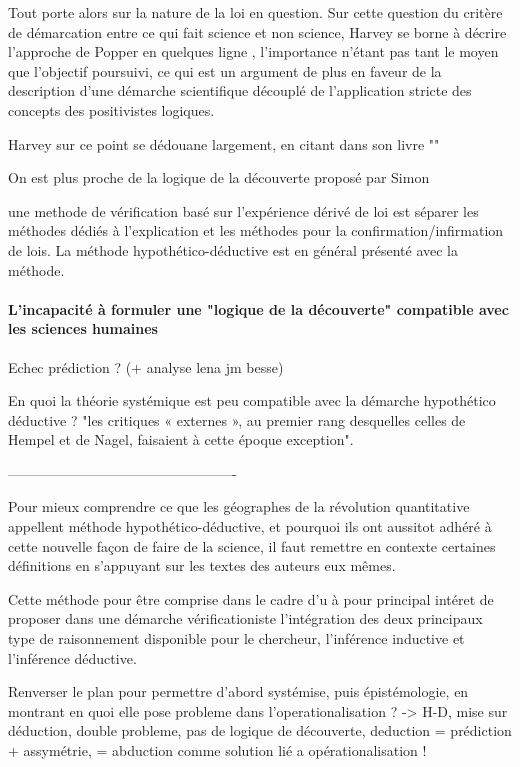 {Tout porte alors sur la nature de la loi en question. Sur cette question du critère de démarcation entre ce qui fait science et non science, Harvey se borne à décrire l'approche de Popper en quelques ligne \autocite{Johnston2002}, l'importance n'étant pas tant le moyen que l'objectif poursuivi, ce qui est un argument de plus en faveur de la description d'une démarche scientifique découplé de l'application stricte des concepts des positivistes logiques.

Harvey sur ce point se dédouane largement, en citant dans son livre ""


On est plus proche de la logique de la découverte proposé par Simon

une methode de vérification basé sur l'expérience dérivé de loi  est séparer les méthodes dédiés à l'explication et les méthodes pour la confirmation/infirmation de lois. La méthode hypothético-déductive est en général présenté avec la méthode.


\paragraph{L'incapacité à formuler une "logique de la découverte" compatible avec les sciences humaines}

Echec prédiction ?
(+ analyse lena jm besse)

En quoi la théorie systémique est peu compatible avec la démarche hypothético déductive ? 
"les critiques « externes », au premier rang desquelles celles de Hempel et de Nagel, faisaient à cette époque exception". \autocite[963]{Pouvreau2013}


-------------------------------------------------


Pour mieux comprendre ce que les géographes de la révolution quantitative appellent méthode hypothético-déductive, et pourquoi ils ont aussitot adhéré à cette nouvelle façon de faire de la science, il faut remettre en contexte certaines définitions en s'appuyant sur les textes des auteurs eux mêmes.

Cette méthode pour être comprise dans le cadre d'u à pour principal intéret de proposer dans une démarche vérificationiste l'intégration des deux principaux type de raisonnement disponible pour le chercheur, l'inférence inductive et l'inférence déductive.

Renverser le plan pour permettre d'abord systémise, puis épistémologie, en montrant en quoi elle pose probleme dans l'operationalisation ?
-> H-D, mise sur déduction, double probleme, pas de logique de découverte, deduction = prédiction + assymétrie, = abduction comme solution lié a opérationalisation !


}
